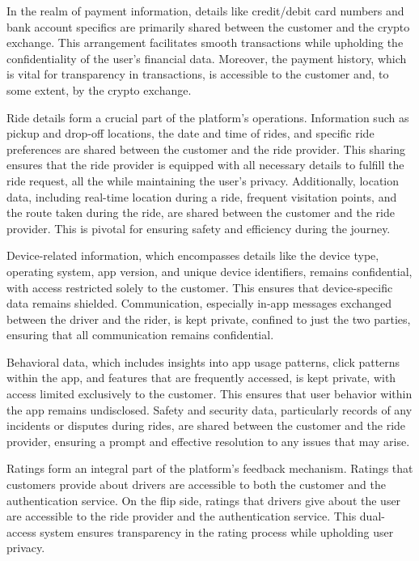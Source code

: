 In the realm of payment information, details like credit/debit card numbers and bank account specifics are primarily shared between the customer and the crypto exchange. This arrangement facilitates smooth transactions while upholding the confidentiality of the user's financial data. Moreover, the payment history, which is vital for transparency in transactions, is accessible to the customer and, to some extent, by the crypto exchange.

Ride details form a crucial part of the platform's operations. Information such as pickup and drop-off locations, the date and time of rides, and specific ride preferences are shared between the customer and the ride provider. This sharing ensures that the ride provider is equipped with all necessary details to fulfill the ride request, all the while maintaining the user's privacy. Additionally, location data, including real-time location during a ride, frequent visitation points, and the route taken during the ride, are shared between the customer and the ride provider. This is pivotal for ensuring safety and efficiency during the journey.

Device-related information, which encompasses details like the device type, operating system, app version, and unique device identifiers, remains confidential, with access restricted solely to the customer. This ensures that device-specific data remains shielded. Communication, especially in-app messages exchanged between the driver and the rider, is kept private, confined to just the two parties, ensuring that all communication remains confidential.

Behavioral data, which includes insights into app usage patterns, click patterns within the app, and features that are frequently accessed, is kept private, with access limited exclusively to the customer. This ensures that user behavior within the app remains undisclosed. Safety and security data, particularly records of any incidents or disputes during rides, are shared between the customer and the ride provider, ensuring a prompt and effective resolution to any issues that may arise.

Ratings form an integral part of the platform's feedback mechanism. Ratings that customers provide about drivers are accessible to both the customer and the authentication service. On the flip side, ratings that drivers give about the user are accessible to the ride provider and the authentication service. This dual-access system ensures transparency in the rating process while upholding user privacy.

